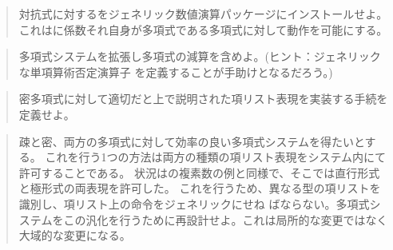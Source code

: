 \begin{quote}
対抗式に対するをジェネリック数値演算パッケージにインストールせよ。
これはに係数それ自身が多項式である多項式に対して動作を可能にする。
\end{quote}

\begin{quote}
多項式システムを拡張し多項式の減算を含めよ。(ヒント：ジェネリックな単項算術否定演算子
を定義することが手助けとなるだろう。)
\end{quote}

\begin{quote}
密多項式に対して適切だと上で説明された項リスト表現を実装する手続を定義せよ。
\end{quote}

\begin{quote}
疎と密、両方の多項式に対して効率の良い多項式システムを得たいとする。
これを行う1つの方法は両方の種類の項リスト表現をシステム内にて許可することである。
状況はの複素数の例と同様で、そこでは直行形式と極形式の両表現を許可した。
これを行うため、異なる型の項リストを識別し、項リスト上の命令をジェネリックにせね
ばならない。多項式システムをこの汎化を行うために再設計せよ。これは局所的な変更ではなく
大域的な変更になる。

\end{quote}

